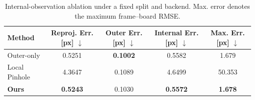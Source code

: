 \begin{table}[t]
\centering
\caption{Internal-observation ablation under a fixed split and backend. Max. error denotes the maximum frame--board RMSE.}
\label{tab:internal_seed_ablation}
\footnotesize
\setlength{\tabcolsep}{1.5pt}
\renewcommand{\arraystretch}{1.05}
\begin{tabular}{@{}lcccc@{}}
\toprule
Method
& \shortstack{Reproj.\\[-1pt]Err. [px] $\downarrow$}
& \shortstack{Outer\\[-1pt]Err. [px] $\downarrow$}
& \shortstack{Internal\\[-1pt]Err. [px] $\downarrow$}
& \shortstack{Max.\\[-1pt]Err. [px] $\downarrow$} \\
\midrule
Outer-only & 0.5251 & \textbf{0.1002} & 0.5582 & 1.679 \\
Local Pinhole & 4.3647 & 0.1089 & 4.6499 & 50.353 \\
\textbf{Ours} & \textbf{0.5243} & 0.1030 & \textbf{0.5572} & \textbf{1.678} \\
\bottomrule
\end{tabular}
\end{table}
